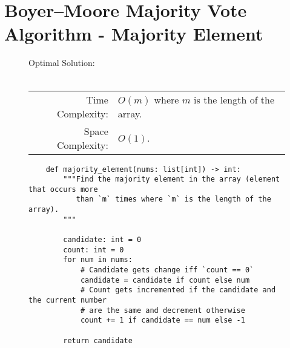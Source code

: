 
\section{Boyer–Moore Majority Vote Algorithm - Majority Element}

\begin{figure}[H]
    Optimal Solution:\\\\
    \begin{tabular}{rl}
        Time Complexity:& \(O(m)\) where \(m\) is the length of the array.\\
        Space Complexity:& \(O(1)\).
    \end{tabular}
\end{figure}

\begin{figure}[H]
    \centering
    \begin{verbatim}
    def majority_element(nums: list[int]) -> int:
        """Find the majority element in the array (element that occurs more
           than `m` times where `m` is the length of the array).
        """

        candidate: int = 0
        count: int = 0
        for num in nums:
            # Candidate gets change iff `count == 0`
            candidate = candidate if count else num
            # Count gets incremented if the candidate and the current number
            # are the same and decrement otherwise
            count += 1 if candidate == num else -1

        return candidate
    \end{verbatim}
\end{figure}
